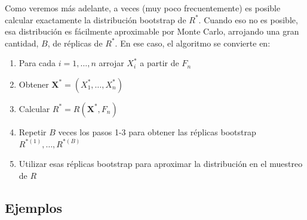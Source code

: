 \documentclass[
]{book}
\renewcommand{\mathbf}[1]{\symbf{#1}}
\theoremstyle{break}
\theoremstyle{nonumberplain}
\begin{document}
Como veremos más adelante, a veces (muy poco frecuentemente) es posible
calcular exactamente la distribución bootstrap de \(R^{\ast}\). Cuando
eso no es posible, esa distribución es fácilmente aproximable por Monte
Carlo, arrojando una gran cantidad, \(B\), de réplicas de \(R^{\ast}\). En
ese caso, el algoritmo se convierte en:

\begin{enumerate}
\def\labelenumi{\arabic{enumi}.}
\item
  Para cada \(i=1,\ldots ,n\) arrojar \(X_i^{\ast}\) a partir de \(F_n\)
\item
  Obtener \(\mathbf{X}^{\ast}=\left( X_1^{\ast},\ldots
  ,X_n^{\ast} \right)\)
\item
  Calcular \(R^{\ast}=R\left( \mathbf{X}^{\ast},F_n \right)\)
\item
  Repetir \(B\) veces los pasos 1-3 para obtener las réplicas bootstrap
  \(R^{\ast (1)}, \ldots, R^{\ast (B)}\)
\item
  Utilizar esas réplicas bootstrap para aproximar la distribución en el
  muestreo de \(R\)
\end{enumerate}

\subsection{Ejemplos}\label{ejemplos}
\end{document}
